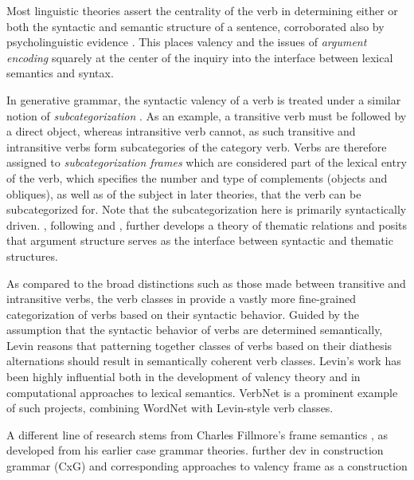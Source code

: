 Most linguistic theories assert the centrality of the verb in determining either or both the syntactic and semantic structure of a sentence, corroborated also by psycholinguistic evidence \citep{healy1970}. This places valency and the issues of \textit{argument encoding} squarely at the center of the inquiry into the interface between lexical semantics and syntax.

In generative grammar, the syntactic valency of a verb is treated under a similar notion of \textit{subcategorization} \citep{chomsky1965a}. As an example, a transitive verb must be followed by a direct object, whereas intransitive verb cannot, as such transitive and intransitive verbs form subcategories of the category verb. Verbs are therefore assigned to \textit{subcategorization frames} which are considered part of the lexical entry of the verb, which specifies the number and type of complements (objects and obliques), as well as of the subject in later theories, that the verb can be subcategorized for. Note that the subcategorization here is primarily syntactically driven. \citet{jackendoff1972,jackendoff1987,jackendoff1992}, following \citet{katz1963} and \citet{gruber1962}, further develops a theory of thematic relations and posits that argument structure serves as the interface between syntactic and thematic structures.


As compared to the broad distinctions such as those made between transitive and intransitive verbs, the verb classes in \citet{levin1993} provide a vastly more fine-grained categorization of verbs based on their syntactic behavior. Guided by the assumption that the syntactic behavior of verbs are determined semantically, Levin reasons that patterning together classes of verbs based on their diathesis alternations should result in semantically coherent verb classes. Levin's work has been highly influential both in the development of valency theory and in computational approaches to lexical semantics. VerbNet \cite{kipper-schuler2005, kipper2006, kipper2008} is a prominent example of such projects, combining WordNet \cite{fellbaum1998, miller1995} with Levin-style verb classes.

A different line of research stems from Charles Fillmore's frame semantics \citep{fillmore1977, fillmore1977a, fillmore1982},
as developed from his earlier
case grammar \citep{fillmore1968,fillmore1970} theories. 
further dev in construction grammar (CxG) and corresponding approaches to valency frame as a construction \citet{goldberg1992,goldberg1995}

